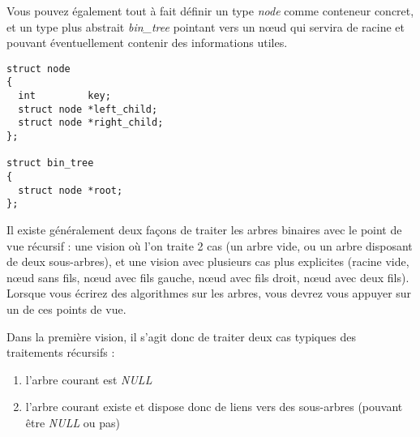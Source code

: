 \documentclass[11pt,a4paper]{article}
\begin{document}
\bigskip

Vous pouvez également tout à fait définir un type \textit{node} comme conteneur concret, et un type plus abstrait \textit{bin\_tree} pointant vers un nœud qui servira de racine et pouvant éventuellement contenir des informations utiles.

\medskip

\lstset{language=C}
\begin{lstlisting}[frame=single]
struct node
{
  int         key;
  struct node *left_child;
  struct node *right_child;
};

struct bin_tree
{
  struct node *root;
};
\end{lstlisting}



Il existe généralement deux façons de traiter les arbres binaires avec le point de vue récursif : une vision où l'on traite 2 cas (un arbre vide, ou un arbre disposant de deux sous-arbres), et une vision avec plusieurs cas plus explicites (racine vide, nœud sans fils, nœud avec fils gauche, nœud avec fils droit, nœud avec deux fils).
Lorsque vous écrirez des algorithmes sur les arbres, vous devrez vous appuyer sur un de ces points de vue.

\medskip

Dans la première vision, il s'agit donc de traiter deux cas typiques des traitements récursifs :

\begin{enumerate}
\item l'arbre courant est \textit{NULL}
\item l'arbre courant existe et dispose donc de liens vers des sous-arbres (pouvant être \textit{NULL} ou pas)
\end{enumerate}

\end{document}
